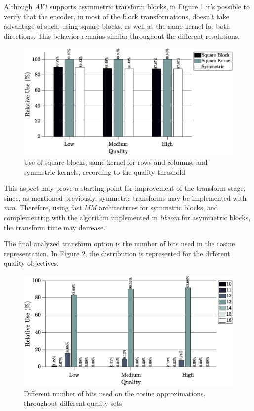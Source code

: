 Although \emph{AV1} supports asymmetric transform blocks, in Figure \ref{fig:squareavg} it's possible to verify that the encoder, in most of the block transformations, doesn't take advantage of such, using square blocks, as well as the same kernel for both directions. This behavior remains similar throughout the different resolutions.

\begin{figure}[!htpb]
    \centering
    \includegraphics[width=\textwidth]{Sections/3Transforms/Images/squareAvg.eps}
    \caption{Use of square blocks, same kernel for rows and columns, and symmetric kernels, according to the quality threshold}
    \label{fig:squareavg}
\end{figure}

This aspect may prove a starting point for improvement of the transform stage, since, as mentioned previously, symmetric transforms may be implemented with \emph{\gls{mm}}. Therefore, using fast \emph{MM} architectures for symmetric blocks, and complementing with the algorithm implemented in \emph{libaom} for asymmetric blocks, the transform time may decrease.

The final analyzed transform option is the number of bits used in the cosine representation. In Figure \ref{fig:cosbitavg}, the distribution is represented for the different quality objectives. 

\begin{figure}[!htpb]
    \centering
    \includegraphics[width=\textwidth]{Sections/3Transforms/Images/cosBitAvg.eps}
    \caption{Different number of bits used on the cosine approximations, throughout different quality sets}
    \label{fig:cosbitavg}
\end{figure}

